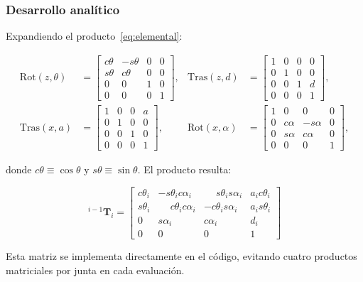 \documentclass[11pt,a4paper]{article}
\newcommand{\T}[2]{{}^{#1}\mathbf{T}_{#2}}
\begin{document}
\subsubsection*{Desarrollo analítico}

Expandiendo el producto~\eqref{eq:elemental}:

\begin{align}
\mathrm{Rot}(z,\theta) &=
\begin{bmatrix}
c\theta & -s\theta & 0 & 0\\
s\theta & c\theta & 0 & 0\\
0&0&1&0\\ 0&0&0&1
\end{bmatrix},
&
\mathrm{Tras}(z,d) &=
\begin{bmatrix}
1&0&0&0\\ 0&1&0&0\\ 0&0&1&d\\ 0&0&0&1
\end{bmatrix},\\[6pt]
\mathrm{Tras}(x,a) &=
\begin{bmatrix}
1&0&0&a\\ 0&1&0&0\\ 0&0&1&0\\ 0&0&0&1
\end{bmatrix},
&
\mathrm{Rot}(x,\alpha) &=
\begin{bmatrix}
1&0&0&0\\
0& c\alpha & -s\alpha & 0\\
0& s\alpha & c\alpha & 0\\
0&0&0&1
\end{bmatrix},
\end{align}

donde $c\theta \equiv \cos\theta$ y $s\theta \equiv \sin\theta$.
El producto resulta:

\begin{equation}
\boxed{\;
\T{i-1}{i} =
\begin{bmatrix}
c\theta_i & -s\theta_i c\alpha_i & \phantom{-}s\theta_i s\alpha_i & a_i c\theta_i\\
s\theta_i & \phantom{-}c\theta_i c\alpha_i & -c\theta_i s\alpha_i & a_i s\theta_i\\
0 & s\alpha_i & c\alpha_i & d_i\\
0 & 0 & 0 & 1
\end{bmatrix}
\;}
\label{eq:dh}
\end{equation}

Esta matriz se implementa directamente en el código, evitando cuatro
productos matriciales por junta en cada evaluación.
\end{document}
